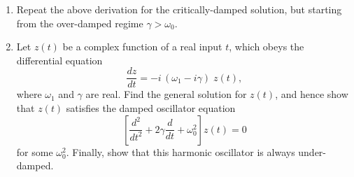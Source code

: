 \documentclass[10pt,a4paper]{article}
\begin{document}
\begin{enumerate}
\item
  Repeat the above derivation for the critically-damped solution, but
  starting from the over-damped regime $\gamma > \omega_0$.

\item
  Let $z(t)$ be a complex function of a real input $t$, which obeys
  the differential equation
  \begin{equation}
    \frac{dz}{dt} = -i\,(\omega_1 - i \gamma)\; z(t),
  \end{equation}
  where $\omega_1$ and $\gamma$ are real. Find the general solution
  for $z(t)$, and hence show that $z(t)$ satisfies the damped
  oscillator equation
  \begin{equation}
    \left[\frac{d^2}{dt^2} + 2\gamma \frac{d}{dt} + \omega_0^2 \right] z(t) = 0
  \end{equation}
  for some $\omega_0^2$. Finally, show that this harmonic oscillator
  is always under-damped.
\end{enumerate}
\end{document}
